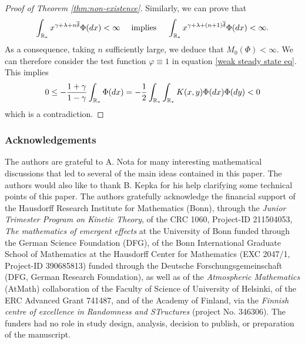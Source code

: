 \documentclass[11pt]{article}
\numberwithin{equation}{section}
\theoremstyle{plain}
\newcommand{\der}{\textup{d}}
\begin{document}
\begin{proof}[Proof of Theorem \ref{thm:non-existence}]
Similarly, we can prove that 
\[
\int_{\mathbb R_*} x^{\gamma+\lambda+ n \overline \delta} \Phi(\der x) < \infty
\quad \text{ implies } \quad
\int_{\mathbb R_*} x^{\gamma+\lambda+(n+1)\overline \delta } \Phi(\der x) < \infty.
\]
As a consequence, taking $n$ sufficiently large, we deduce that $M_0(\Phi)< \infty$. 
We can therefore consider the test function $\varphi\equiv 1$ in equation \eqref{weak steady state eq}. 
This implies 
\begin{align*}
0\leq- \frac{1+\gamma}{1-\gamma} \int_{\mathbb R_*}  \Phi( \der x) 
 =-\frac{1}{2}\int_{\mathbb R_*} \int_{\mathbb R_*} K(x,y)\Phi( \der x) \Phi( \der y)<0
\end{align*}
which is a contradiction. 
\end{proof} 



\subsubsection*{Acknowledgements}
The authors are grateful to A. Nota for many interesting mathematical discussions that led to several of the main ideas contained in this paper.  
The authors would also like to thank
B. Kepka for his help clarifying some technical points of this paper. 
The authors gratefully acknowledge the financial support of the Hausdorff Research Institute for Mathematics (Bonn), through the \textit{Junior Trimester Program on Kinetic Theory}, of the CRC 1060, Project-ID 211504053,
\textit{The mathematics of emergent effects} at the University of Bonn funded through the German
Science Foundation (DFG), of the Bonn International Graduate School of Mathematics at the Hausdorff Center for Mathematics (EXC 2047/1, Project-ID 390685813) funded through the Deutsche Forschungsgemeinschaft (DFG, German Research Foundation),
as well as of the \textit{Atmospheric Mathematics}
(AtMath) collaboration of the Faculty of Science of University of Helsinki, of the ERC Advanced Grant 741487, and of the Academy of Finland, via the  \textit{Finnish centre of excellence in Randomness and STructures} (project No. 346306). 
The funders had no role in study
design, analysis, decision to publish, or preparation of the manuscript.
\end{document}
